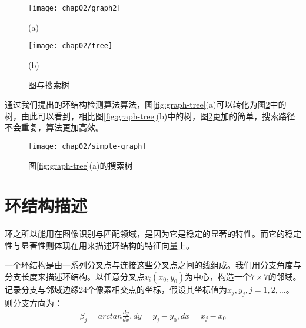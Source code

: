 \begin{figure}
\centering
  \begin{minipage}[b]{1\textwidth} 
      \centering 
       \texttt{[image: chap02/graph2]}
       \centerline{(a)}\medskip
    \end{minipage}
  \begin{minipage}[b]{1\textwidth}
    \centering
    \texttt{[image: chap02/tree]}
    \centerline{(b)}\medskip
  \end{minipage}
\caption{图与搜索树}
\label{fig:cycle-tree}
\end{figure}

通过我们提出的环结构检测算法算法，图\ref{fig:graph-tree}(a)可以转化为图\ref{fig:simple-tree}中的树，由此可以看到，相比图\ref{fig:graph-tree}(b)中的树，图\ref{fig:simple-tree}更加的简单，搜索路径不会重复，算法更加高效。

\begin{figure}
\centering
\texttt{[image: chap02/simple-graph]}
\caption{图\ref{fig:graph-tree}(a)的搜索树}
\label{fig:simple-tree}
\end{figure}


\section{环结构描述}
\label{}
环之所以能用在图像识别与匹配领域，是因为它是稳定的显著的特性。而它的稳定性与显著性则体现在用来描述环结构的特征向量上。

一个环结构是由一系列分叉点与连接这些分叉点之间的线组成。我们用分支角度与分支长度来描述环结构。以任意分叉点$v_i(x_0, y_0)$为中心，构造一个$7 \times 7$的邻域。记录分支与邻域边缘24个像素相交点的坐标，假设其坐标值为$x_j, y_j, j=1, 2, \ldots$。则分支方向为：
\begin{align}
\beta_j = arctan\frac{dy}{dx}, dy = y_j - y_0, dx = x_j - x_0 
\end{align}

